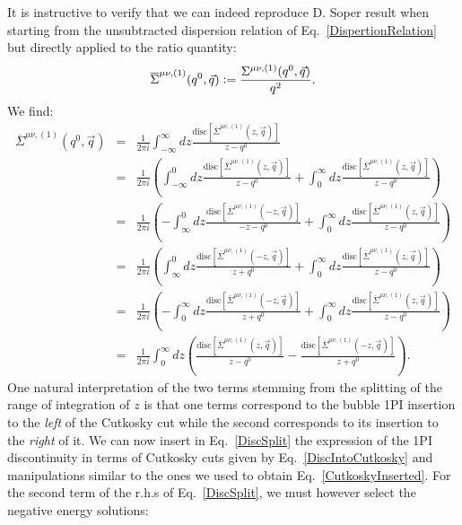\documentclass[11pt]{article}
\begin{document}
It is instructive to verify that we can indeed reproduce D. Soper result when starting from the unsubtracted dispersion relation of Eq.~\ref{DispertionRelation} but directly applied to the ratio quantity:
\begin{equation}
\overline{\Sigma}^{\mu\nu,(1)}(q^0, \vec{q}) \vcentcolon =  \frac{\Sigma^{\mu\nu,(1)}(q^0, \vec{q})}{q^2}.
\end{equation}
We find:
\begin{eqnarray}
\overline{\Sigma}^{\mu\nu,(1)}(q^0, \vec{q}) &=& \frac{1}{2\pi i } \int_{-\infty}^\infty d z \frac{ \textrm{disc} \left[\overline{\Sigma}^{\mu\nu,(1)}(z, \vec{q}) \right] }{z-q^0} \nonumber \\
&=& \frac{1}{2\pi i } \left(  \int_{-\infty}^0 d z \frac{ \textrm{disc} \left[\overline{\Sigma}^{\mu\nu,(1)}(z, \vec{q}) \right] }{z-q^0} + \int_{0}^\infty d z \frac{ \textrm{disc} \left[\overline{\Sigma}^{\mu\nu,(1)}(z, \vec{q}) \right] }{z-q^0} \right) \nonumber \\
&=& \frac{1}{2\pi i } \left(  -\int_{\infty}^0 d z \frac{ \textrm{disc} \left[ \overline{\Sigma}^{\mu\nu,(1)}(-z, \vec{q}) \right] }{-z-q^0} + \int_{0}^\infty d z \frac{ \textrm{disc} \left[\overline{\Sigma}^{\mu\nu,(1)}(z, \vec{q}) \right] }{z-q^0} \right) \nonumber \\
&=& \frac{1}{2\pi i } \left(  \int_{\infty}^0 d z \frac{ \textrm{disc} \left[ \overline{\Sigma}^{\mu\nu,(1)}(-z, \vec{q}) \right] }{z+q^0} + \int_{0}^\infty d z \frac{ \textrm{disc} \left[\overline{\Sigma}^{\mu\nu,(1)}(z, \vec{q}) \right] }{z-q^0} \right) \nonumber \\
&=& \frac{1}{2\pi i } \left(  -\int_{0}^\infty d z \frac{ \textrm{disc} \left[ \overline{\Sigma}^{\mu\nu,(1)}(-z, \vec{q}) \right] }{z+q^0} + \int_{0}^\infty d z \frac{ \textrm{disc} \left[\overline{\Sigma}^{\mu\nu,(1)}(z, \vec{q}) \right] }{z-q^0} \right) \nonumber \\
&=& \frac{1}{2\pi i } \int_{0}^\infty d z \left( \frac{ \textrm{disc} \left[\overline{\Sigma}^{\mu\nu,(1)}(z, \vec{q}) \right] }{z-q^0} - \frac{ \textrm{disc} \left[ \overline{\Sigma}^{\mu\nu,(1)}(-z, \vec{q}) \right] }{z+q^0} \right).
\label{DiscSplit}
\end{eqnarray}
One natural interpretation of the two terms stemming from the splitting of the range of integration of $z$ is that one terms correspond to the bubble 1PI insertion to the \emph{left} of the Cutkosky cut while the second corresponds to its insertion to the \emph{right} of it.
We can now insert in Eq.~\ref{DiscSplit} the expression of the 1PI discontinuity in terms of Cutkosky cuts given by Eq.~\ref{DiscIntoCutkosky} and manipulations similar to the ones we used to obtain Eq.~\ref{CutkoskyInserted}. For the second term of the r.h.s of Eq.~\ref{DiscSplit}, we must however select the negative energy solutions:
\end{document}
